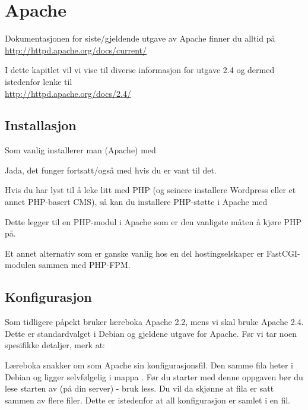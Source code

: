 \chapter{Apache}  %

Dokumentasjonen for siste/gjeldende utgave av Apache finner
du alltid på\\ \url{http://httpd.apache.org/docs/current/}

I dette kapitlet vil vi vise til diverse informasjon for 
utgave 2.4 og dermed istedenfor lenke til\\
\url{http://httpd.apache.org/docs/2.4/} \cite{docs:apache}

\section{Installasjon}

Som vanlig installerer man (Apache) med 


Jada, det funger fortsatt/også med  hvis du er vant til det.

Hvis du har lyst til å leke litt med PHP (og seinere installere Wordpress
eller et annet PHP-basert CMS), så kan du installere PHP-støtte i Apache med


Dette legger til en PHP-modul i Apache som er den vanligste måten å kjøre PHP på.

Et annet alternativ som er ganske vanlig hos en del hostingselskaper 
er FastCGI-modulen sammen med PHP-FPM.

\section{Konfigurasjon}

Som tidligere påpekt bruker læreboka Apache 2.2, mens vi skal bruke Apache 2.4. 
Dette er standardvalget i Debian og gjeldene utgave for Apache. Før vi tar
noen spesifikke detaljer, merk at:

\begin{remark}
Læreboka snakker om  som Apache sin konfigurasjonsfil. 
Den samme fila heter  i Debian og ligger selvfølgelig i 
mappa . Før du starter med denne oppgaven bør du lese starten 
av  (på din server) - bruk less. Du vil da skjønne at 
fila  er satt sammen av flere filer. Dette er istedenfor at 
all konfigurasjon er samlet i en  fil.
\end{remark}

